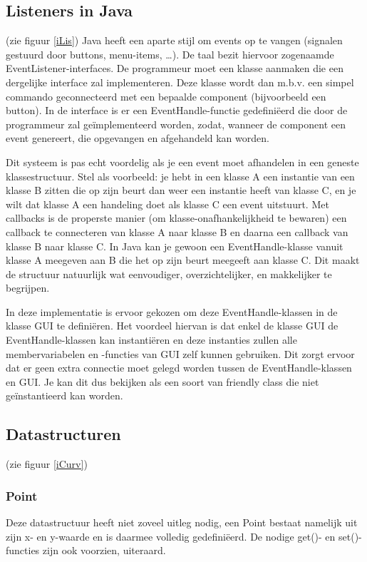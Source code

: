 \documentclass[a4paper,11pt,oneside, titlepage]{article}
\begin{document}
\subsection{Listeners in Java }
(zie figuur \ref{iLis})
Java heeft een aparte stijl om events op te vangen (signalen gestuurd door buttons, menu-items,
\ldots). De taal bezit hiervoor zogenaamde EventListener-interfaces. De programmeur
moet een klasse aanmaken die een dergelijke interface zal implementeren. Deze klasse wordt dan
m.b.v. een simpel commando geconnecteerd met een bepaalde component (bijvoorbeeld een button).
In de interface is er een EventHandle-functie gedefini\"eerd die door de programmeur zal 
ge\"implementeerd worden, zodat, wanneer de component een event genereert,
die opgevangen en afgehandeld kan worden.\newline

Dit systeem is pas echt voordelig als je een event moet afhandelen in een geneste klassestructuur. 
Stel als voorbeeld: je hebt in een klasse A een instantie van een klasse B zitten
die op zijn beurt dan weer een instantie heeft van klasse C, en je wilt dat klasse A een handeling
doet als klasse C een event uitstuurt.
Met callbacks is de properste manier (om klasse-onafhankelijkheid te bewaren) een callback 
te connecteren van klasse A naar klasse B en daarna een callback van klasse B naar klasse C.
In Java kan je gewoon een EventHandle-klasse vanuit klasse A meegeven aan B die het op zijn 
beurt meegeeft aan klasse C. Dit maakt de structuur natuurlijk wat eenvoudiger, overzichtelijker, en makkelijker te begrijpen.\newline \newline

In deze implementatie is ervoor gekozen om deze EventHandle-klassen in de klasse GUI te 
defini\"eren. Het voordeel hiervan is dat enkel de klasse GUI de EventHandle-klassen kan 
instanti\"eren en deze instanties zullen alle membervariabelen en -functies van GUI zelf kunnen 
gebruiken. Dit zorgt ervoor dat er geen extra connectie moet gelegd worden tussen de 
EventHandle-klassen en GUI. Je kan dit dus bekijken als een soort van friendly class die niet ge\"instantieerd kan worden.
\subsection{Datastructuren}
(zie figuur \ref{iCurv})
\subsubsection{Point}
Deze datastructuur heeft niet zoveel uitleg nodig, een Point bestaat namelijk uit zijn x- en y-waarde en is daarmee
volledig gedefini\"eerd. De nodige get()- en set()-functies zijn ook voorzien, uiteraard.
\end{document}
